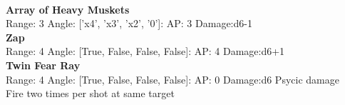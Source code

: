 \ \\
{\bf Array of Heavy Muskets } \\



Range: 3  Angle: ['x4', 'x3', 'x2', '0']: AP: 3 Damage:d6-1 \\




{\bf Zap } \\



Range: 4  Angle: [True, False, False, False]: AP: 4 Damage:d6+1 \\




{\bf Twin Fear Ray } \\



Range: 4  Angle: [True, False, False, False]: AP: 0 Damage:d6 Psycic damage \\
Fire two times per shot at same target\\ 




 
\ \\



